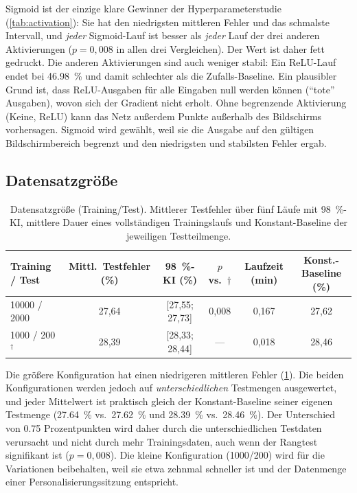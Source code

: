 \documentclass[
  11pt,
  a4paper,
  oneside,
  DIV=12,
  BCOR=8mm,
  parskip=half,
  headings=normal,
  bibliography=totoc,
  listof=totoc
]{scrreprt}
\newcommand{\sel}{\ensuremath{^{\dagger}}}
\begin{document}
Sigmoid ist der einzige klare Gewinner der Hyperparameterstudie
(\cref{tab:activation}): Sie hat den niedrigsten mittleren Fehler und das
schmalste Intervall, und \emph{jeder} Sigmoid-Lauf ist besser als \emph{jeder}
Lauf der drei anderen Aktivierungen ($p=0,008$ in allen drei Vergleichen).
Der Wert ist daher fett gedruckt. Die anderen Aktivierungen sind auch weniger
stabil: Ein ReLU-Lauf endet bei \SI{46,98}{\percent} und damit schlechter als
die Zufalls-Baseline. Ein plausibler Grund ist, dass ReLU-Ausgaben für alle
Eingaben null werden können (\enquote{tote} Ausgaben), wovon sich der Gradient
nicht erholt. Ohne begrenzende Aktivierung (Keine, ReLU) kann das Netz
außerdem Punkte außerhalb des Bildschirms vorhersagen. Sigmoid wird gewählt,
weil sie die Ausgabe auf den gültigen Bildschirmbereich begrenzt und den
niedrigsten und stabilsten Fehler ergab.

\subsection{Datensatzgröße}
\label{sec:size}

\begin{table}[htbp]
  \centering
  \caption{Datensatzgröße (Training/Test). Mittlerer Testfehler über fünf
           Läufe mit \SI{98}{\percent}-KI, mittlere Dauer eines vollständigen
           Trainingslaufs und Konstant-Baseline der jeweiligen Testteilmenge.}
  \label{tab:dataset_size}
  \small
  \setlength{\tabcolsep}{3.5pt}
  \begin{tabular}{lccccc}
    \toprule
    Training / Test & Mittl.\ Testfehler (\%) & \SI{98}{\percent}-KI (\%) & $p$ vs.\ $\dagger$ & Laufzeit (min) & Konst.-Baseline (\%) \\
    \midrule
    \num{10000} / \num{2000}      & 27,64 & [27,55; 27,73] & 0,008 & 0,167 & 27,62 \\
    \num{1000} / \num{200}\sel{}  & 28,39 & [28,33; 28,44] & ---   & 0,018 & 28,46 \\
    \bottomrule
  \end{tabular}
\end{table}

Die größere Konfiguration hat einen niedrigeren mittleren Fehler
(\cref{tab:dataset_size}). Die beiden Konfigurationen werden jedoch auf
\emph{unterschiedlichen} Testmengen ausgewertet, und jeder Mittelwert ist
praktisch gleich der Konstant-Baseline seiner eigenen Testmenge
(\SI{27,64}{\percent} vs.\ \SI{27,62}{\percent} und \SI{28,39}{\percent} vs.\
\SI{28,46}{\percent}). Der Unterschied von \num{0,75} Prozentpunkten wird
daher durch die unterschiedlichen Testdaten verursacht und nicht durch mehr
Trainingsdaten, auch wenn der Rangtest signifikant ist ($p=0,008$). Die kleine
Konfiguration (\num{1000}/\num{200}) wird für die Variationen beibehalten,
weil sie etwa zehnmal schneller ist und der Datenmenge einer
Personalisierungssitzung entspricht.
\end{document}
